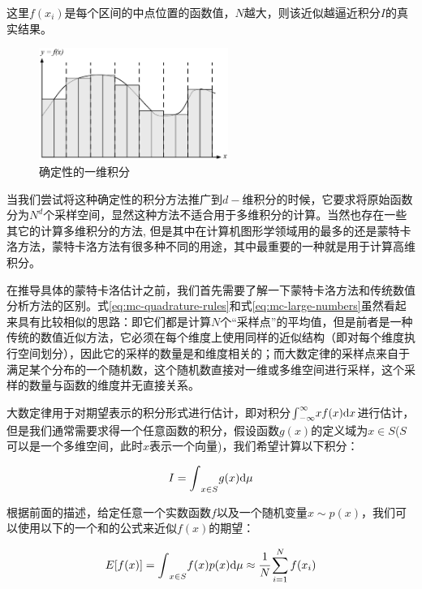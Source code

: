 \noindent 这里$f(x_i)$是每个区间的中点位置的函数值，$N$越大，则该近似越逼近积分$I$的真实结果。

\begin{figure}
\sidecaption
	\includegraphics[width=0.55\textwidth]{figures/mc/mc-finite-integration}
	\caption{确定性的一维积分}
	\label{f:mc-quadrature-rules}
\end{figure} 

当我们尝试将这种确定性的积分方法推广到$d-$维积分的时候，它要求将原始函数分为$N^d$个采样空间，显然这种方法不适合用于多维积分的计算。当然也存在一些其它的计算多维积分的方法, 但是其中在计算机图形学领域用的最多的还是蒙特卡洛方法，蒙特卡洛方法有很多种不同的用途，其中最重要的一种就是用于计算高维积分。

在推导具体的蒙特卡洛估计之前，我们首先需要了解一下蒙特卡洛方法和传统数值分析方法的区别。式\ref{eq:mc-quadrature-rules}和式\ref{eq:mc-large-numbers}虽然看起来具有比较相似的思路：即它们都是计算$N$个“采样点”的平均值，但是前者是一种传统的数值近似方法，它必须在每个维度上使用同样的近似结构（即对每个维度执行空间划分），因此它的采样的数量是和维度相关的；而大数定律的采样点来自于满足某个分布的一个随机数，这个随机数直接对一维或多维空间进行采样，这个采样的数量与函数的维度并无直接关系。

大数定律用于对期望表示的积分形式进行估计，即对积分${\rm \int}_{-\infty}^{\infty}xf(x){\rm d}x$进行估计，但是我们通常需要求得一个任意函数的积分，假设函数$g(x)$的定义域为$x\in S$($S$可以是一个多维空间，此时$x$表示一个向量)，我们希望计算以下积分：

\begin{equation}
	I={\rm \int}_{x\in S}g(x){\rm d}\mu
\end{equation}

根据前面的描述，给定任意一个实数函数$f$以及一个随机变量$x\sim p(x)$，我们可以使用以下的一个和的公式来近似$f(x)$的期望：

\begin{equation}\label{e:sum}
	E[f(x)]={\rm \int}_{x\in S}f(x)p(x){\rm d}\mu\approx \cfrac{1}{N}\sum_{i=1}^{N}f(x_i)
\end{equation}


